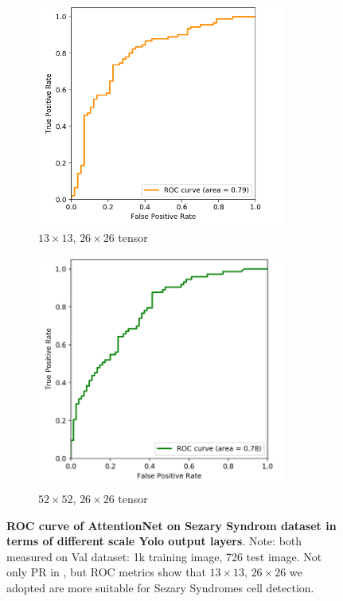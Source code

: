 \begin{figure}[h]
	\begin{center}
		\begin{subfigure}[b]{0.49\textwidth}
			\includegraphics[width=0.9\textwidth]{thesis-template-master/images/2 tensor cellyolo ROC.png}
			\caption{$13 \times 13$, $26 \times 26$ tensor  }
			\label{fig:res18}
		\end{subfigure}
		\begin{subfigure}[b]{0.49\textwidth}
		    \centering
			\includegraphics[width=0.9\textwidth]{thesis-template-master/images/52 tensor cellyolo ROC.png}
			\caption{$52 \times 52$, $26 \times 26$ tensor  }
			\label{fig:cellnet}
		\end{subfigure}
	\end{center}
	\caption{\textbf{ROC curve of AttentionNet on Sezary Syndrom dataset in terms of different scale Yolo output layers}. Note: both measured on Val dataset: 1k training image, 726 test image. Not only PR in \eg{}, but ROC metrics show that $13\times13$, $26\times26$ we adopted are more suitable for Sezary Syndromes cell detection.}
	\label{fig:5.1}
\end{figure}


